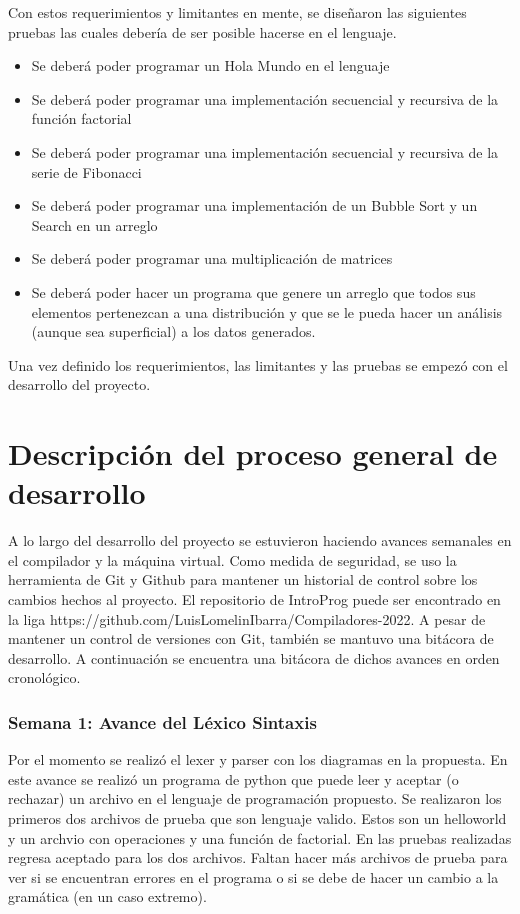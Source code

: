 Con estos requerimientos y limitantes en mente, se diseñaron las siguientes pruebas las cuales debería de ser posible hacerse en el lenguaje.

\begin{itemize}
    \item Se deberá poder programar un Hola Mundo en el lenguaje
    \item Se deberá poder programar una implementación secuencial y recursiva de la función factorial
    \item Se deberá poder programar una implementación secuencial y recursiva de la serie de Fibonacci
    \item Se deberá poder programar una implementación de un Bubble Sort y un Search en un arreglo
    \item Se deberá poder programar una multiplicación de matrices
    \item Se deberá poder hacer un programa que genere un arreglo que todos sus elementos pertenezcan a una distribución y que se le pueda hacer un análisis (aunque sea superficial) a los datos generados.
\end{itemize}

Una vez definido los requerimientos, las limitantes y las pruebas se empezó con el desarrollo del proyecto.


\section{Descripción del proceso general de desarrollo}

A lo largo del desarrollo del proyecto se estuvieron haciendo avances semanales en el compilador y la máquina virtual. Como medida de seguridad, se uso la herramienta de Git y Github para mantener un historial de control sobre los cambios hechos al proyecto. El repositorio de IntroProg puede ser encontrado en la liga https://github.com/LuisLomelinIbarra/Compiladores-2022. A pesar de mantener un control de versiones con Git, también se mantuvo una bitácora de desarrollo. A continuación se encuentra una bitácora de dichos avances en orden cronológico.

\subsubsection{Semana 1: Avance del Léxico Sintaxis}
Por el momento se realizó el lexer y parser con los diagramas en la propuesta. En este avance se realizó un programa de python que puede leer y aceptar (o rechazar) un archivo en el lenguaje de programación propuesto. Se realizaron los primeros dos archivos de prueba que son lenguaje valido. Estos son un helloworld y un archvio con operaciones y una función de factorial. En las pruebas realizadas regresa aceptado para los dos archivos. Faltan hacer más archivos de prueba para ver si se encuentran errores en el programa o si se debe de hacer un cambio a la gramática (en un caso extremo).


